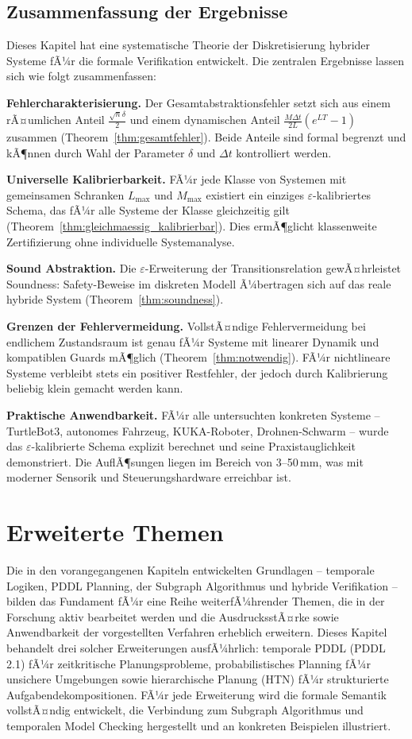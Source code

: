 ﻿\documentclass[a4paper,12pt]{article}
\theoremstyle{definition}
\begin{document}
\subsection{Zusammenfassung der Ergebnisse}

Dieses Kapitel hat eine systematische Theorie der Diskretisierung hybrider Systeme fÃ¼r die formale Verifikation entwickelt. Die zentralen Ergebnisse lassen sich wie folgt zusammenfassen:

\textbf{Fehlercharakterisierung.} Der Gesamtabstraktionsfehler setzt sich aus einem rÃ¤umlichen Anteil $\frac{\sqrt{n}\delta}{2}$ und einem dynamischen Anteil $\frac{M\Delta t}{2L}(e^{LT}-1)$ zusammen (Theorem~\ref{thm:gesamtfehler}). Beide Anteile sind formal begrenzt und kÃ¶nnen durch Wahl der Parameter $\delta$ und $\Delta t$ kontrolliert werden.

\textbf{Universelle Kalibrierbarkeit.} FÃ¼r jede Klasse von Systemen mit gemeinsamen Schranken $L_{\max}$ und $M_{\max}$ existiert ein einziges $\varepsilon$-kalibriertes Schema, das fÃ¼r alle Systeme der Klasse gleichzeitig gilt (Theorem~\ref{thm:gleichmaessig_kalibrierbar}). Dies ermÃ¶glicht klassenweite Zertifizierung ohne individuelle Systemanalyse.

\textbf{Sound Abstraktion.} Die $\varepsilon$-Erweiterung der Transitionsrelation gewÃ¤hrleistet Soundness: Safety-Beweise im diskreten Modell Ã¼bertragen sich auf das reale hybride System (Theorem~\ref{thm:soundness}).

\textbf{Grenzen der Fehlervermeidung.} VollstÃ¤ndige Fehlervermeidung bei endlichem Zustandsraum ist genau fÃ¼r Systeme mit linearer Dynamik und kompatiblen Guards mÃ¶glich (Theorem~\ref{thm:notwendig}). FÃ¼r nichtlineare Systeme verbleibt stets ein positiver Restfehler, der jedoch durch Kalibrierung beliebig klein gemacht werden kann.

\textbf{Praktische Anwendbarkeit.} FÃ¼r alle untersuchten konkreten Systeme -- TurtleBot3, autonomes Fahrzeug, KUKA-Roboter, Drohnen-Schwarm -- wurde das $\varepsilon$-kalibrierte Schema explizit berechnet und seine Praxistauglichkeit demonstriert. Die AuflÃ¶sungen liegen im Bereich von 3--50\,mm, was mit moderner Sensorik und Steuerungshardware erreichbar ist.


\section{Erweiterte Themen}

Die in den vorangegangenen Kapiteln entwickelten Grundlagen -- temporale Logiken, PDDL Planning, der Subgraph Algorithmus und hybride Verifikation -- bilden das Fundament fÃ¼r eine Reihe weiterfÃ¼hrender Themen, die in der Forschung aktiv bearbeitet werden und die AusdrucksstÃ¤rke sowie Anwendbarkeit der vorgestellten Verfahren erheblich erweitern. Dieses Kapitel behandelt drei solcher Erweiterungen ausfÃ¼hrlich: temporale PDDL (PDDL 2.1) fÃ¼r zeitkritische Planungsprobleme, probabilistisches Planning fÃ¼r unsichere Umgebungen sowie hierarchische Planung (HTN) fÃ¼r strukturierte Aufgabendekompositionen. FÃ¼r jede Erweiterung wird die formale Semantik vollstÃ¤ndig entwickelt, die Verbindung zum Subgraph Algorithmus und temporalen Model Checking hergestellt und an konkreten Beispielen illustriert.
\end{document}
